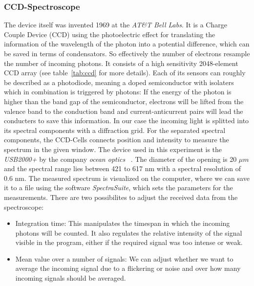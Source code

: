 \subsubsection{CCD-Spectroscope}
The device itself was invented 1969 at the 
\textit{AT\&T Bell Labs}. It is a Charge Couple Device (CCD) using
the photoelectric effect for translating the information of the 
wavelength
of the photon into a potential difference, which can be saved
in terms of condensators. So effectively the number of electrons
resample the number of incoming photons.
It consists of a high sensitivity 2048-element CCD array 
(see table~\ref{tab:ccd} for more details). Each of its sensors 
can roughly be described as a photodiode, meaning a doped
semiconductor with isolaters which in combination is triggered
by photons: If the energy of the photon is higher than the 
band gap of the semiconductor, electrons will be lifted from the
valence band to the conduction band and current-anticurrent pairs
will lead the conducters to save this information. In our case
the incoming light is splitted into its spectral components with
a diffraction grid. For the separated spectral components, the  
CCD-Cells connects position and intensity to measure the 
spectrum in the given window. 
The device used in this experiment is the \textit{USB2000+} 
by the company \textit{ocean optics}
~\cite{versuchsanleitung}. 
The diameter of the opening is 20 $\mu m$ and the spectral range lies 
between 421 to 617 nm with a spectral resolution of 0.6 nm.
The measured spectrum is visualized on the computer, where we
can save it to a file using the software
\textit{SpectraSuite}, which sets the parameters for the 
measurements. There are two possibilites to adjust
the received data from the spectroscope:
\begin{itemize}
    \item Integration time: This manipulates the timespan in 
        which the incoming photons will be counted. It also
        regulates the relative intensity of the signal
        visible in the program, either
        if the required signal was too intense or weak.
    \item Mean value over a number of signals: We can adjust
        whether we want to average the incoming signal due to
        a flickering or noise and over how many incoming signals
        should be averaged.
\end{itemize}


